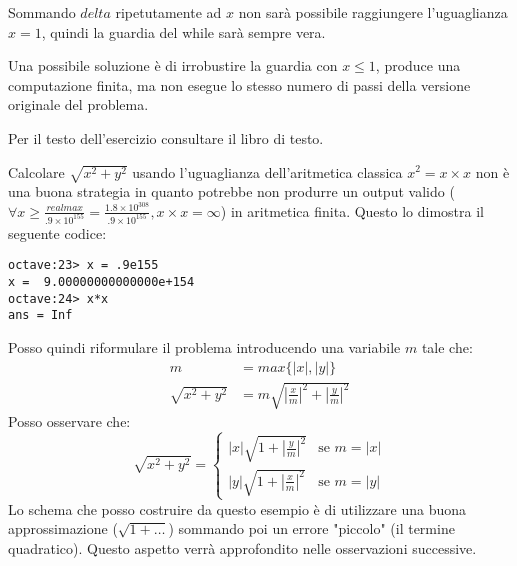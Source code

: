 Sommando $delta$ ripetutamente ad $x$ non sar\`a possibile raggiungere l'uguaglianza
$x = 1$, quindi la guardia del while sar\`a sempre vera.

Una possibile soluzione \`e di irrobustire la guardia con $x \leq 1$, produce una 
computazione finita, ma non esegue lo stesso numero di passi della versione originale
del problema.

\begin{exercise}[1.12]
Per il testo dell'esercizio consultare il libro di testo.
\end{exercise}
Calcolare $\sqrt{x^{2} + y^{2}}$ usando l'uguaglianza dell'aritmetica classica 
$x^{2} = x \times x$ non \`e una buona strategia in quanto potrebbe non produrre
un output valido ($\forall x \geq \frac{realmax}
	{.9 \times 10^{155}} = \frac{1.8 \times 10^{308}}
	{.9 \times 10^{155}}, x \times x = \infty$) 
in aritmetica finita.
Questo lo dimostra il seguente codice:
\begin{lstlisting}
octave:23> x = .9e155
x =  9.00000000000000e+154
octave:24> x*x
ans = Inf
\end{lstlisting}
Posso quindi riformulare il problema introducendo una variabile $m$ tale che:
\begin{displaymath}
\begin{split}
	m &= max \lbrace |x|, |y| \rbrace \\
	\sqrt{x^{2} + y^{2}} &= m \sqrt{{\left |\frac{x}{m} \right |}^{2} + 
		{\left |\frac{y}{m} \right |}^{2}}
\end{split}
\end{displaymath}
Posso osservare che:
\begin{displaymath}
 \sqrt{x^{2} + y^{2}} = \left \lbrace
		\begin{array}{lc}
			|x| \sqrt{1 + {\left |\frac{y}{m} \right |}^{2}} & \text{se } m = |x| \\ 
			|y| \sqrt{1 + {\left |\frac{x}{m} \right |}^{2}} & \text{se } m = |y|
		\end{array} \right .
\end{displaymath}
Lo schema che posso costruire da questo esempio \`e di utilizzare una buona approssimazione
($\sqrt{1 + \ldots}$) sommando poi un errore "piccolo" (il termine quadratico). Questo aspetto 
verr\`a approfondito nelle osservazioni successive.

